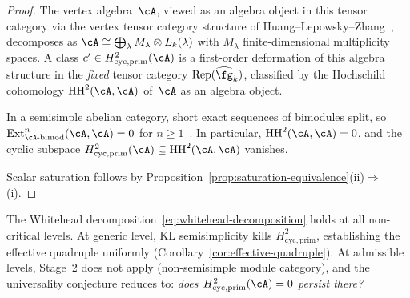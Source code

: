 \begin{proof}
The vertex algebra~$\cA$, viewed as an algebra object in
this tensor category via the vertex tensor category
structure of Huang--Lepowsky--Zhang~\cite{HLZ}, decomposes as
$\cA \cong \bigoplus_\lambda M_\lambda \otimes L_k(\lambda)$
with $M_\lambda$ finite-dimensional multiplicity spaces.
A class $c' \in H^2_{\mathrm{cyc,prim}}(\cA)$ is a
first-order deformation of this algebra structure in the
\emph{fixed} tensor category
$\mathrm{Rep}(\widehat{\fg}_k)$, classified by the
Hochschild cohomology $\mathrm{HH}^2(\cA, \cA)$ of~$\cA$
as an algebra object.

In a semisimple abelian category, short exact sequences
of bimodules split, so
$\mathrm{Ext}^n_{{\cA}\text{-bimod}}({\cA}, {\cA}) = 0$ for
$n \geq 1$~\cite{EGNO}.
In particular,
$\mathrm{HH}^2(\cA, \cA) = 0$, and
the cyclic subspace
$H^2_{\mathrm{cyc,prim}}(\cA)
\subseteq \mathrm{HH}^2(\cA, \cA)$
vanishes.

Scalar saturation follows by
Proposition~\ref{prop:saturation-equivalence}(ii)$\Rightarrow$(i).
\end{proof}

\begin{remark}
\label{rem:cyclic-rigidity-scope}
The Whitehead decomposition~\eqref{eq:whitehead-decomposition} holds
at all non-critical levels.  At generic level, KL semisimplicity kills
$H^2_{\mathrm{cyc,prim}}$, establishing the effective quadruple
uniformly (Corollary~\ref{cor:effective-quadruple}).
At admissible levels, Stage~2 does not apply (non-semisimple module
category), and the universality conjecture reduces to:
\emph{does $H^2_{\mathrm{cyc,prim}}(\cA)=0$ persist there?}
\end{remark}

